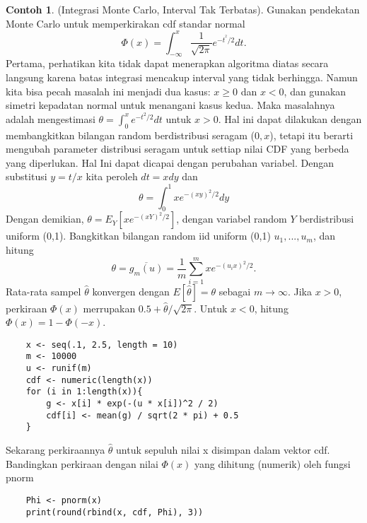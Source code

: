 \documentclass[a4paper,12pt]{article}
\theoremstyle{definition}
\newtheorem{example}{Contoh}[section]
\begin{document}
\begin{example}
    (Integrasi Monte Carlo, Interval Tak Terbatas). Gunakan pendekatan Monte Carlo untuk memperkirakan cdf standar normal
    \begin{equation}
        \Phi (x)=\int_{-\infty }^{x}\frac{1}{\sqrt{2\pi }}e^{-t^{^2}/2}dt.
    \end{equation}
    Pertama, perhatikan kita tidak dapat menerapkan algoritma diatas secara langsung karena batas integrasi mencakup interval yang tidak berhingga. Namun kita bisa pecah masalah ini menjadi dua kasus: $x\geq 0$ dan $x< 0$, dan gunakan simetri kepadatan normal untuk menangani kasus kedua. Maka masalahnya adalah mengestimasi $\theta = \int_{0}^{x}e^{-t^{2}/2}dt$ untuk $x>0$. Hal ini dapat dilakukan dengan membangkitkan bilangan  random berdistribusi seragam ($0,x$), tetapi itu berarti mengubah parameter distribusi seragam untuk settiap nilai CDF yang berbeda yang diperlukan.
    Hal Ini dapat dicapai dengan perubahan variabel. Dengan substitusi $y= t/x$ kita peroleh $dt= x dy$ dan
    \begin{equation}
        \theta = \int_{0}^{1}xe^{-(xy)^{2}/2}dy
    \end{equation}
    Dengan demikian, $\theta = E_{Y}[xe^{-(xY)^{2}/2}]$, dengan variabel random $Y$ berdistribusi uniform (0,1). Bangkitkan bilangan random iid uniform (0,1) $u_{1},...,u_{m}$, dan hitung
    \begin{equation}
      \theta = \overline{g_{m}(u)}= \frac{1}{m}\sum_{i=1}^{m}xe^{-(u_{i}x)^{2}/2}.  
    \end{equation}
    Rata-rata sampel $\hat{\theta}$ konvergen dengan $E[\hat{\theta}]= \theta $ sebagai $m\rightarrow \infty 
$. Jika $x>0$, perkiraan $\Phi (x)$ merrupakan $0.5+\hat{\theta}/\sqrt{2\pi }$. Untuk $x<0$, hitung $\Phi (x)= 1-\Phi (-x)$.
\label{ex-1}
\end{example}

\begin{lstlisting}
    x <- seq(.1, 2.5, length = 10)
    m <- 10000
    u <- runif(m)
    cdf <- numeric(length(x))
    for (i in 1:length(x)){
        g <- x[i] * exp(-(u * x[i])^2 / 2)
        cdf[i] <- mean(g) / sqrt(2 * pi) + 0.5
    }
\end{lstlisting}

Sekarang perkiraannya $\hat{\theta}$ untuk sepuluh nilai x disimpan dalam vektor cdf. Bandingkan perkiraan dengan nilai $\Phi (x)$ yang dihitung (numerik) oleh fungsi pnorm

\begin{lstlisting}
    Phi <- pnorm(x)
    print(round(rbind(x, cdf, Phi), 3))
\end{lstlisting}
\end{document}
